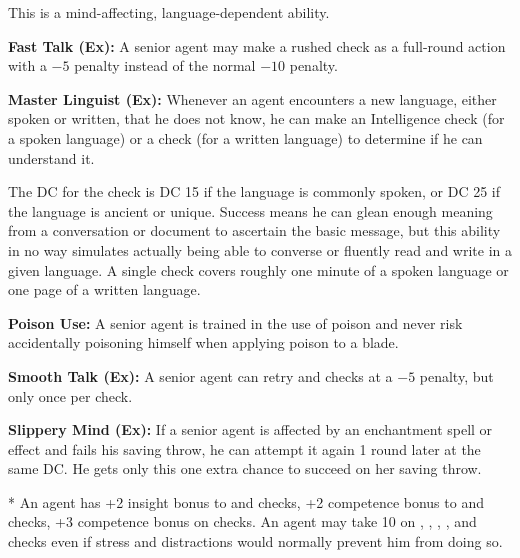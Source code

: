 This is a mind-affecting, language-dependent ability.

\textbf{Fast Talk (Ex):} A senior agent may make a rushed  check as a full-round action with a $-5$ penalty instead of the normal $-10$ penalty.

\textbf{Master Linguist (Ex):} Whenever an agent encounters a new language, either spoken or written, that he does not know, he can make an Intelligence check (for a spoken language) or a  check (for a written language) to determine if he can understand it.

The DC for the check is DC 15 if the language is commonly spoken, or DC 25 if the language is ancient or unique. Success means he can glean enough meaning from a conversation or document to ascertain the basic message, but this ability in no way simulates actually being able to converse or fluently read and write in a given language. A single check covers roughly one minute of a spoken language or one page of a written language.

\textbf{Poison Use:} A senior agent is trained in the use of poison and never risk accidentally poisoning himself when applying poison to a blade.

\textbf{Smooth Talk (Ex):} A senior agent can retry  and  checks at a $-5$ penalty, but only once per check.

\textbf{Slippery Mind (Ex):} If a senior agent is affected by an enchantment spell or effect and fails his saving throw, he can attempt it again 1 round later at the same DC. He gets only this one extra chance to succeed on her saving throw.

* An agent has +2 insight bonus to  and  checks, +2 competence bonus to  and  checks, +3 competence bonus on  checks. An agent may take 10 on , , , , and  checks even if stress and distractions would normally prevent him from doing so.

